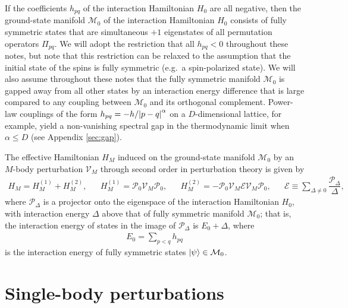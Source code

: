 \documentclass[nofootinbib,notitlepage,11pt]{revtex4-2}
\newcommand{\f}[2]{\dfrac{#1}{#2}} %
\newcommand{\1}{\mathds{1}}
\newcommand{\E}{\mathcal{E}}
\newcommand{\M}{\mathcal{M}}
\renewcommand{\P}{\mathcal{P}}
\newcommand{\V}{\mathcal{V}}
\begin{document}
If the coefficients $h_{pq}$ of the interaction Hamiltonian $H_0$ are
all negative, then the ground-state manifold $\M_0$ of the interaction
Hamiltonian $H_0$ consists of fully symmetric states that are
simultaneous $+1$ eigenstates of all permutation operators $\Pi_{pq}$.
We will adopt the restriction that all $h_{pq}<0$ throughout these
notes, but note that this restriction can be relaxed to the assumption
that the initial state of the spins is fully symmetric (e.g.~a
spin-polarized state).  We will also assume throughout these notes
that the fully symmetric manifold $\M_0$ is gapped away from all other
states by an interaction energy difference that is large compared to
any coupling between $\M_0$ and its orthogonal complement.  Power-law
couplings of the form $h_{pq}=-h/\abs{p-q}^\alpha$ on a
$D$-dimensional lattice, for example, yield a non-vanishing spectral
gap in the thermodynamic limit when $\alpha\le D$ (see Appendix
\ref{sec:gap}).

The effective Hamiltonian $H_M$ induced on the ground-state manifold
$\M_0$ by an $M$-body perturbation $\V_M$ through second order in
perturbation theory is given by\cite{bravyi2011schrieffer,
  perlin2019effective}
\begin{align}
  H_M = H_M^{(1)} + H_M^{(2)},
  &&
  H_M^{(1)} = \P_0 \V_M \P_0,
  &&
  H_M^{(2)} = - \P_0 \V_M \E \V_M \P_0,
  &&
  \E \equiv \sum_{\Delta\ne0} \f{\P_\Delta}{\Delta},
\end{align}
where $\P_\Delta$ is a projector onto the eigenspace of the
interaction Hamiltonian $H_0$, with interaction energy $\Delta$ above
that of fully symmetric manifold $\M_0$; that is, the interaction
energy of states in the image of $\P_\Delta$ is $E_0+\Delta$, where
\begin{align}
  E_0 = \sum_{p<q} h_{pq}
\end{align}
is the interaction energy of fully symmetric states $\ket\psi\in\M_0$.

\section{Single-body perturbations}
\label{sec:single_body_pert}
\end{document}
